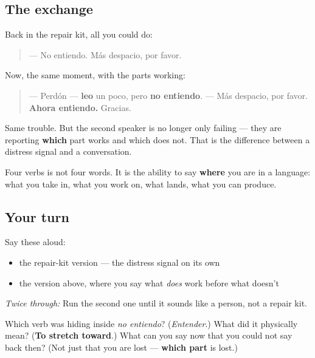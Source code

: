 \subsection*{The exchange}
Back in the repair kit, all you could do:

\begin{quote}
— No entiendo. Más despacio, por favor.
\end{quote}

Now, the same moment, with the parts working:

\begin{quote}
— Perdón — \textbf{leo} un poco, pero \textbf{no entiendo}. — Más despacio, por favor. \textbf{Ahora entiendo.} Gracias.
\end{quote}

Same trouble. But the second speaker is no longer only failing — they are reporting \textbf{which} part works and which does not. That is the difference between a distress signal and a conversation.

\begin{grammarlens}[title={What you've built}]
Four verbs is not four words. It is the ability to say \textbf{where} you are in a language: what you take in, what you work on, what lands, what you can produce.
\end{grammarlens}

\subsection*{Your turn}
Say these aloud:

\begin{itemize}
\raggedright
  \item the repair-kit version — the distress signal on its own
  \item the version above, where you say what \emph{does} work before what doesn't
\end{itemize}

\emph{Twice through:} Run the second one until it sounds like a person, not a repair kit.

\begin{tcolorbox}[breakable,colback=teal!4,colframe=teal!35!black,title={Before you move on}]
Which verb was hiding inside \emph{no entiendo}? (\emph{Entender}.) What did it physically mean? (\textbf{To stretch toward}.) What can you say now that you could not say back then? (Not just that you are lost — \textbf{which part} is lost.)
\end{tcolorbox}
